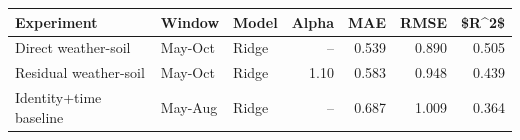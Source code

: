 \begin{tabular}{lllrrrr}
\toprule
Experiment & Window & Model & Alpha & MAE & RMSE & \$R\textasciicircum{}2\$ \\
\midrule
Direct weather-soil & May-Oct & Ridge & -- & 0.539 & 0.890 & 0.505 \\
Residual weather-soil & May-Oct & Ridge & 1.10 & 0.583 & 0.948 & 0.439 \\
Identity+time baseline & May-Aug & Ridge & -- & 0.687 & 1.009 & 0.364 \\
\bottomrule
\end{tabular}
